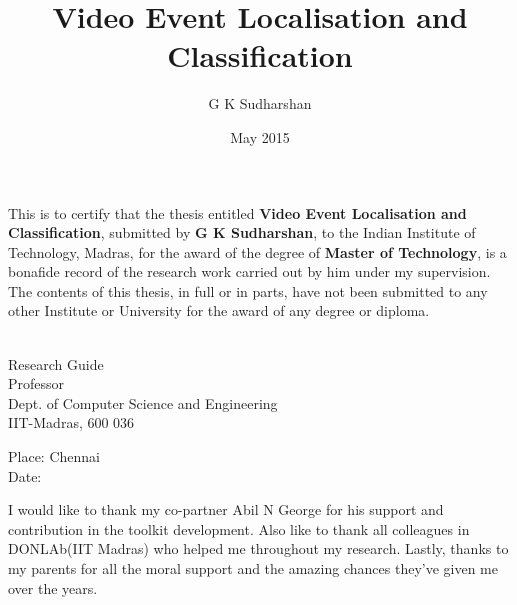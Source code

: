 \documentclass[MTech]{iitmdiss}
\def\thesistitle{Video Event Localisation and Classification}
\def\thesisauthor{G K Sudharshan}
\begin{document}


\title{\thesistitle}
\author{\thesisauthor}

\date{May 2015}

\begin{singlespace}
\maketitle 
\end{singlespace} 



\certificate
\vspace*{0.5in}

\noindent This is to certify that the thesis entitled {\bf {\thesistitle}}, 
submitted by {\bf {\thesisauthor}}, to the Indian Institute of Technology, 
Madras, for the award of the degree of {\bf Master of Technology}, 
is a bonafide record of the research work carried out by him under my
supervision. The contents of this thesis, in full or in parts, have not been
submitted to any other Institute or University for the award of any degree or diploma.
\vspace*{1.4in}
\hspace*{-0.25in}
\begin{singlespace}
 \\
\noindent Research Guide \\ 
\noindent Professor \\
\noindent Dept. of Computer Science and Engineering\\
\noindent IIT-Madras, 600 036 \\
\end{singlespace}
\vspace*{0.20in}
\noindent Place: Chennai\\ 
Date:

\acknowledgements
I would like to thank my co-partner Abil N George for his
support and contribution in the toolkit development. Also like to thank all colleagues in DONLAb(IIT Madras) who helped me throughout my research.  Lastly, thanks to my parents for all the moral support and the amazing chances they've given me over the years.
\end{document}
